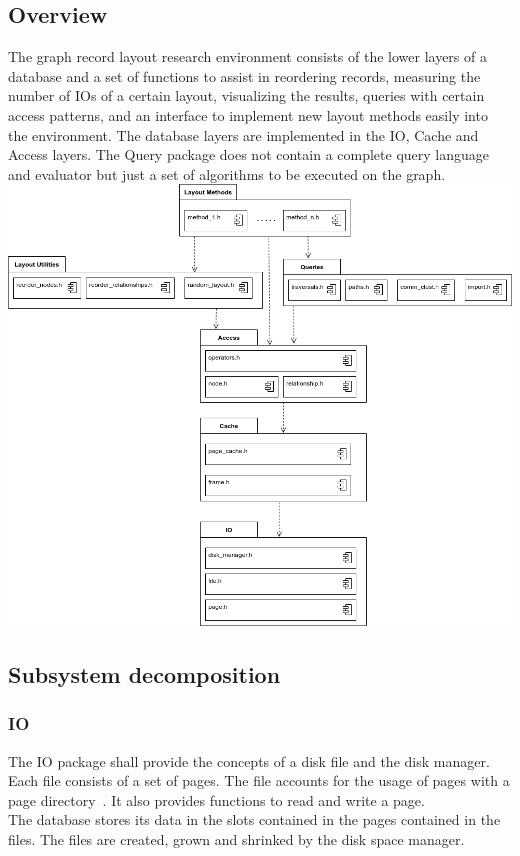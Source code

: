 \subsection{Overview}
The graph record layout research environment consists of the lower layers of a database and a set of functions to assist in reordering records, measuring the number of IOs of a certain layout, visualizing the results, queries with certain access patterns, and an interface to implement new layout methods easily into the environment. The database layers are implemented in the IO, Cache and Access layers. The Query package does not contain a complete query language and evaluator but just a set of algorithms to be executed on the graph. \\ [2em]

\hspace{-2cm}\includegraphics[keepaspectratio,width=1.2\textwidth, height=.7\textheight]{img/overview.png}

\newpage

\subsection{Subsystem decomposition}
    \subsubsection{IO}
        The IO package shall provide the concepts of a disk file and the disk manager. \\
        Each file consists of a set of pages. The file accounts for the usage of pages with a page directory~\autocite{ramakrishnan2000database}. It also provides functions to read and write a page. \\
        The database stores its data in the slots contained in the pages contained in the files. The files are created, grown and shrinked by the disk space manager.   \\
        
